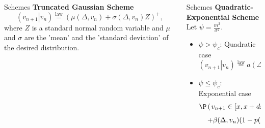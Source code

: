 \documentclass[]{beamer}
\begin{document}
\begin{frame}[t]
\begin{columns}[t]
\begin{column}{\twocolwid}
\begin{columns}[t,totalwidth=\twocolwid]
\begin{column}{\onecolwid}
\begin{block}{Schemes}
    \textbf{Truncated Gaussian Scheme}
    \begin{equation}
        \left(\left.v_{n+1}\right| v_n\right) \overset{\text{law}}{=} \left(\mu(\Delta, v_n) + \sigma(\Delta, v_n) Z\right)^+,
    \end{equation}
    where $Z$ is a standard normal random variable and $\mu$ and $\sigma$ are the 'mean' and the 'standard deviation' of the desired distribution.
    
    \end{block}
    
    \
    
    
    \end{column} %
    
    \begin{column}{\onecolwid}\vspace{-.6in} %
    
    
    \begin{block}{Schemes}
    \textbf{Quadratic-Exponential Scheme}
    Let $\psi = \frac{m^2}{\sigma^2}$. 
    \begin{itemize}
        \item{$\psi > \psi_c$: } Quadratic case
        \begin{equation}
            \left(\left.v_{n+1}\right| v_n\right) \overset{\text{law}}{=} a(\Delta, v_n) \left(b(\Delta, v_n) + Z\right)^2;
        \end{equation}
        \item{$\psi \leq \psi_c$: } Exponential case
        \begin{multline}
            \P\left(\left. v_{n+1} \in [x, x+dx]\right|v_n\right) = \left(p(\Delta, v_n)\delta(0) \right.+\\\left.+ \beta(\Delta, v_n)(1-p(\Delta, v_n))e^{-\beta(\Delta, v_n) x}\right)dx.
        \end{multline}
    \end{itemize}
    \end{block}
    
    

\end{column}
\end{columns}
\end{column}
\end{columns}
\end{frame}
\end{document}
